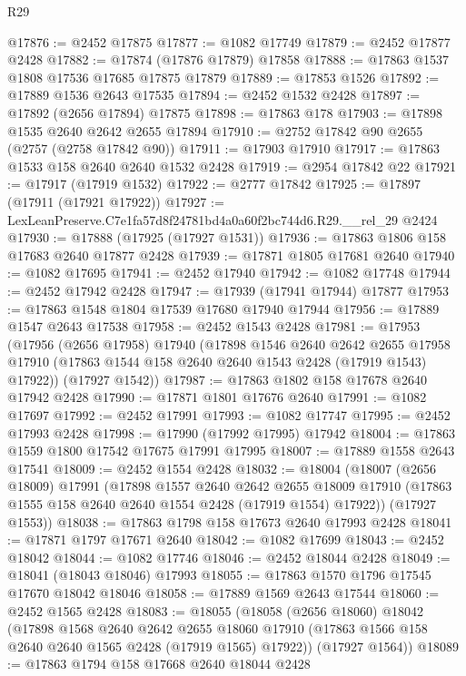 \begin{lexlean}{R29}
\begin{coremodule}
@17876 := @2452 @17875
@17877 := @1082 @17749
@17879 := @2452 @17877 @2428
@17882 := @17874 (@17876 @17879) @17858
@17888 := @17863 @1537 @1808 @17536 @17685 @17875 @17879
@17889 := @17853 @1526
@17892 := @17889 @1536 @2643 @17535
@17894 := @2452 @1532 @2428
@17897 := @17892 (@2656 @17894) @17875
@17898 := @17863 @178
@17903 := @17898 @1535 @2640 @2642 @2655 @17894
@17910 := @2752 @17842 @90 @2655 (@2757 (@2758 @17842 @90))
@17911 := @17903 @17910
@17917 := @17863 @1533 @158 @2640 @2640 @1532 @2428
@17919 := @2954 @17842 @22
@17921 := @17917 (@17919 @1532)
@17922 := @2777 @17842
@17925 := @17897 (@17911 (@17921 @17922))
@17927 := LexLeanPreserve.C7e1fa57d8f24781bd4a0a60f2bc744d6.R29.__rel_29 @2424
@17930 := @17888 (@17925 (@17927 @1531))
@17936 := @17863 @1806 @158 @17683 @2640 @17877 @2428
@17939 := @17871 @1805 @17681 @2640
@17940 := @1082 @17695
@17941 := @2452 @17940
@17942 := @1082 @17748
@17944 := @2452 @17942 @2428
@17947 := @17939 (@17941 @17944) @17877
@17953 := @17863 @1548 @1804 @17539 @17680 @17940 @17944
@17956 := @17889 @1547 @2643 @17538
@17958 := @2452 @1543 @2428
@17981 := @17953
    (@17956
      (@2656 @17958)
      @17940
      (@17898
        @1546
        @2640
        @2642
        @2655
        @17958
        @17910
        (@17863 @1544 @158 @2640 @2640 @1543 @2428 (@17919 @1543) @17922))
      (@17927 @1542))
@17987 := @17863 @1802 @158 @17678 @2640 @17942 @2428
@17990 := @17871 @1801 @17676 @2640
@17991 := @1082 @17697
@17992 := @2452 @17991
@17993 := @1082 @17747
@17995 := @2452 @17993 @2428
@17998 := @17990 (@17992 @17995) @17942
@18004 := @17863 @1559 @1800 @17542 @17675 @17991 @17995
@18007 := @17889 @1558 @2643 @17541
@18009 := @2452 @1554 @2428
@18032 := @18004
    (@18007
      (@2656 @18009)
      @17991
      (@17898
        @1557
        @2640
        @2642
        @2655
        @18009
        @17910
        (@17863 @1555 @158 @2640 @2640 @1554 @2428 (@17919 @1554) @17922))
      (@17927 @1553))
@18038 := @17863 @1798 @158 @17673 @2640 @17993 @2428
@18041 := @17871 @1797 @17671 @2640
@18042 := @1082 @17699
@18043 := @2452 @18042
@18044 := @1082 @17746
@18046 := @2452 @18044 @2428
@18049 := @18041 (@18043 @18046) @17993
@18055 := @17863 @1570 @1796 @17545 @17670 @18042 @18046
@18058 := @17889 @1569 @2643 @17544
@18060 := @2452 @1565 @2428
@18083 := @18055
    (@18058
      (@2656 @18060)
      @18042
      (@17898
        @1568
        @2640
        @2642
        @2655
        @18060
        @17910
        (@17863 @1566 @158 @2640 @2640 @1565 @2428 (@17919 @1565) @17922))
      (@17927 @1564))
@18089 := @17863 @1794 @158 @17668 @2640 @18044 @2428

\end{coremodule}
\end{lexlean}
